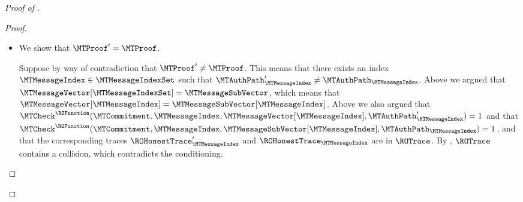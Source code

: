 \begin{proof}[Proof of ]
\begin{enumerate}
\begin{proof}
\begin{itemize}
We have established that:
\begin{itemize}[nolistsep]
  \item $\ROHonestTrace_{\MTMessageIndex}$ is contained in $\ROTrace$, and $\MTCheck^{\ROFunction}(\MTCommitment,\MTMessageIndex,\MTMessageSubVector[\MTMessageIndex],\MTAuthPath_{\MTMessageIndex})=1$; and
  \item $\ROHonestTrace'_{\MTMessageIndex}$ is contained in $\ROTrace$, and $\MTCheck^{\ROFunction}(\MTCommitment,\MTMessageIndex,\MTMessageVector[\MTMessageIndex],\MTAuthPath'_{\MTMessageIndex})= 1$.
\end{itemize}

Now suppose by way of contradiction that $\MTMessageVector[\MTMessageIndexSet] \neq \MTMessageSubVector$. By , $\ROTrace$ contains a collision, which contradicts the conditioning.

  \item We show that $\MTProof' = \MTProof$.

Suppose by way of contradiction that $\MTProof' \neq \MTProof$. This means that there exists an index $\MTMessageIndex \in \MTMessageIndexSet$ such that $\MTAuthPath'_{\MTMessageIndex} \neq \MTAuthPath_{\MTMessageIndex}$. Above we argued that $\MTMessageVector[\MTMessageIndexSet] = \MTMessageSubVector$, which means that $\MTMessageVector[\MTMessageIndex] = \MTMessageSubVector[\MTMessageIndex]$. Above we also argued that $\MTCheck^{\ROFunction}(\MTCommitment,\MTMessageIndex,\MTMessageVector[\MTMessageIndex],\MTAuthPath'_{\MTMessageIndex})=1$ and that $\MTCheck^{\ROFunction}(\MTCommitment,\MTMessageIndex,\MTMessageSubVector[\MTMessageIndex],\MTAuthPath_{\MTMessageIndex})=1$, and that the corresponding traces $\ROHonestTrace'_{\MTMessageIndex}$ and $\ROHonestTrace_{\MTMessageIndex}$ are in $\ROTrace$. By , $\ROTrace$ contains a collision, which contradicts the conditioning.


\end{itemize}
\end{proof}
\end{enumerate}
\end{proof}
